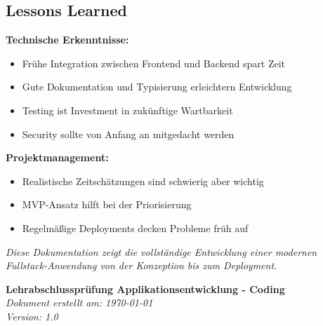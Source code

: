 \documentclass[a4paper,12pt]{article}
\begin{document}
\subsection{Lessons Learned}

\textbf{Technische Erkenntnisse:}
\begin{itemize}
    \item Fr{\"u}he Integration zwischen Frontend und Backend spart Zeit
    \item Gute Dokumentation und Typisierung erleichtern Entwicklung
    \item Testing ist Investment in zuk{\"u}nftige Wartbarkeit
    \item Security sollte von Anfang an mitgedacht werden
\end{itemize}

\textbf{Projektmanagement:}
\begin{itemize}
    \item Realistische Zeitsch{\"a}tzungen sind schwierig aber wichtig
    \item MVP-Ansatz hilft bei der Priorisierung
    \item Regelm{\"a}{\ss}ige Deployments decken Probleme fr{\"u}h auf
\end{itemize}

\vfill
\begin{center}
\textit{Diese Dokumentation zeigt die vollst{\"a}ndige Entwicklung einer modernen Fullstack-Anwendung von der Konzeption bis zum Deployment.}

\vspace{1cm}

\textbf{Lehrabschlusspr{\"u}fung Applikationsentwicklung - Coding}\\
\textit{Dokument erstellt am: \today}\\
\textit{Version: 1.0}
\end{center}
\end{document}
